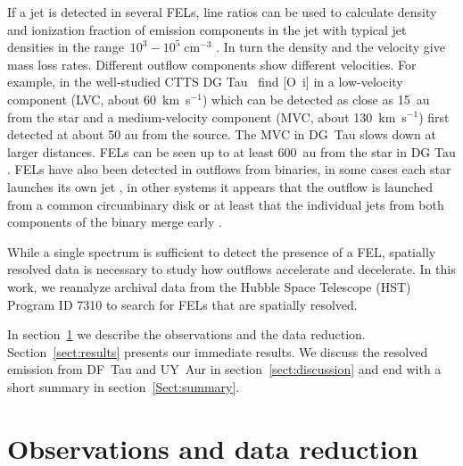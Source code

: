 \documentclass[twocolumn,trackchanges]{aastex63}
\begin{document}

If a
jet is detected in several FELs, line ratios can be used to
calculate density and ionization fraction of emission components in the
jet with typical jet densities in the range~$10^3-10^5\;\mathrm{cm}^{-3}$
\citep[e.g.][]{1993ApJ...410L..31S,1999A&A...342..717B,2000A&A...356L..41L,2013A&A...550L...1S}. In turn
the density and the velocity give mass loss rates. Different outflow
components show different velocities. For example, in the well-studied
CTTS DG Tau~\citet{2013A&A...550L...1S} find [O~{\sc i}] in a low-velocity
component (LVC, about 60~km~s$^{-1}$) which can be detected as
close as 15~au from the star and a medium-velocity component (MVC, about
130~km~s$^{-1}$) first detected at about 50 au from the source. The MVC in DG~Tau
slows down at larger distances. 
FELs can be seen up to at least 600~au from the
star in DG Tau \citep{1993ApJ...410L..31S}. FELs have also been detected in outflows from
binaries, in some cases each star launches its own jet \citep[e.g.\ in
  T~Tau][]{1999ApJ...523..709S}, in other systems it appears that the outflow
is launched from a common circumbinary disk or at least that the individual
jets from both components of the binary merge early \citep{2010ApJ...708L...5M}. 

While a single spectrum is sufficient to
detect the presence of a FEL, spatially resolved data is necessary to study
how outflows accelerate and decelerate. In this work, we reanalyze
archival data from the Hubble Space Telescope (HST) Program ID 7310  to
search for FELs that are spatially resolved.

In section~\ref{sect:obs} we describe the observations and the data reduction. Section~\ref{sect:results} presents our immediate results. We discuss the resolved emission from DF~Tau and UY~Aur in section~\ref{sect:discussion} and end with a short summary in section~\ref{Sect:summary}.

\section{Observations and data reduction}
\label{sect:obs}
\end{document}
